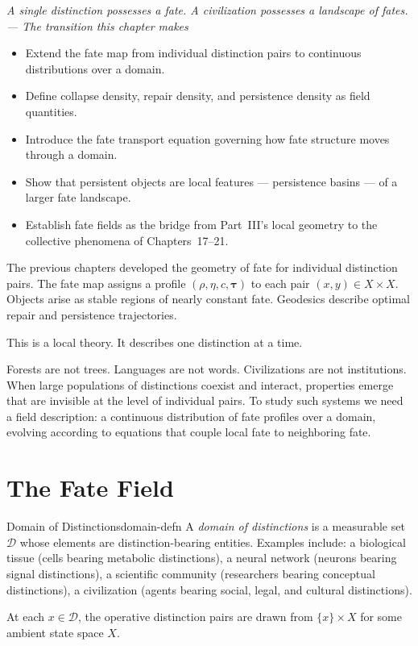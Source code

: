 \documentclass[12pt,twoside,openright]{book}
\newcommand{\survRatio}{\rho}             %
\newcommand{\repEff}{\eta}               %
\newcommand{\collapseInd}{c}             %
\newenvironment{epigraph}[2]{%
  \vspace{1em}\begin{flushright}
  \begin{minipage}{0.72\textwidth}
  \itshape\small #1\\[0.4em]
  \upshape\footnotesize\sffamily\color{DistGray}--- #2
  \end{minipage}\end{flushright}\vspace{1.5em}}{}
\newenvironment{objectives}{%
  \begin{tcolorbox}[colback=DistBlue!5,colframe=DistBlue,
    title={\faCheckCircle\enspace Chapter Objectives},
    fonttitle=\sffamily\bfseries\color{white},
    attach boxed title to top left={yshift=-2mm,xshift=4mm},
    boxed title style={colback=DistBlue},breakable]
  \begin{itemize}[leftmargin=*,nosep]}{%
  \end{itemize}\end{tcolorbox}\vspace{1em}}
\begin{document}
\begin{epigraph}{A single distinction possesses a fate. A
  civilization possesses a landscape of fates.}{The transition
  this chapter makes}
\end{epigraph}

\begin{objectives}
\item Extend the fate map from individual distinction pairs
  to continuous distributions over a domain.
\item Define collapse density, repair density, and persistence
  density as field quantities.
\item Introduce the fate transport equation governing how fate
  structure moves through a domain.
\item Show that persistent objects are local features ---
  persistence basins --- of a larger fate landscape.
\item Establish fate fields as the bridge from Part~III's local
  geometry to the collective phenomena of Chapters~17--21.
\end{objectives}

The previous chapters developed the geometry of fate for
individual distinction pairs. The fate map assigns a profile
$(\survRatio,\repEff,\collapseInd,\boldsymbol{\tau})$ to each
pair $(x,y)\in X\times X$. Objects arise as stable regions
of nearly constant fate. Geodesics describe optimal repair
and persistence trajectories.

This is a local theory. It describes one distinction at a time.

Forests are not trees. Languages are not words. Civilizations
are not institutions. When large populations of distinctions
coexist and interact, properties emerge that are invisible at
the level of individual pairs. To study such systems we need a
field description: a continuous distribution of fate profiles
over a domain, evolving according to equations that couple
local fate to neighboring fate.

\section{The Fate Field}

\begin{definition}{Domain of Distinctions}{domain-defn}
A \emph{domain of distinctions} is a measurable set
$\mathcal{D}$ whose elements are distinction-bearing entities.
Examples include: a biological tissue (cells bearing metabolic
distinctions), a neural network (neurons bearing signal
distinctions), a scientific community (researchers bearing
conceptual distinctions), a civilization (agents bearing
social, legal, and cultural distinctions).

At each $x\in\mathcal{D}$, the operative distinction pairs are
drawn from $\{x\}\times X$ for some ambient state space $X$.
\end{definition}
\end{document}
